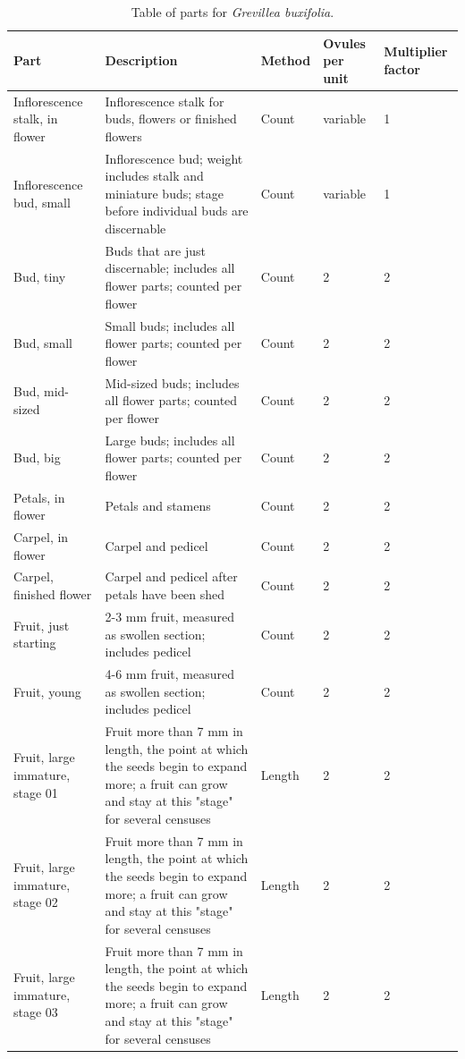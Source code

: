 \documentclass[10pt,twoside]{article}\usepackage[]{graphicx}\usepackage[]{color}
\begin{document}
\begin{longtable}{p{4.5cm}p{6cm}p{2cm}p{1cm}p{1cm}}
\caption{Table of parts for \emph{Grevillea buxifolia}.} \\ 
  \hline
Part & Description & Method & Ovules per unit & Multiplier factor \\ 
  \hline
Inflorescence stalk, in flower & Inflorescence stalk for buds, flowers or finished flowers & Count & variable &   1 \\ 
  Inflorescence bud, small & Inflorescence bud; weight includes stalk and miniature buds; stage before individual buds are discernable & Count & variable &   1 \\ 
  Bud, tiny & Buds that are just discernable; includes all flower parts; counted per flower & Count & 2 &   2 \\ 
  Bud, small & Small buds; includes all flower parts; counted per flower & Count & 2 &   2 \\ 
  Bud, mid-sized & Mid-sized buds; includes all flower parts; counted per flower & Count & 2 &   2 \\ 
  Bud, big & Large buds; includes all flower parts; counted per flower & Count & 2 &   2 \\ 
  Petals, in flower & Petals and stamens & Count & 2 &   2 \\ 
  Carpel, in flower & Carpel and pedicel & Count & 2 &   2 \\ 
  Carpel, finished flower & Carpel and pedicel after petals have been shed & Count & 2 &   2 \\ 
  Fruit, just starting & 2-3 mm fruit, measured as swollen section; includes pedicel & Count & 2 &   2 \\ 
  Fruit, young & 4-6 mm fruit, measured as swollen section; includes pedicel & Count & 2 &   2 \\ 
  Fruit, large immature, stage 01 & Fruit more than 7 mm in length, the point at which the seeds begin to expand more; a fruit can grow and stay at this "stage" for several censuses & Length & 2 &   2 \\ 
  Fruit, large immature, stage 02 & Fruit more than 7 mm in length, the point at which the seeds begin to expand more; a fruit can grow and stay at this "stage" for several censuses & Length & 2 &   2 \\ 
  Fruit, large immature, stage 03 & Fruit more than 7 mm in length, the point at which the seeds begin to expand more; a fruit can grow and stay at this "stage" for several censuses & Length & 2 &   2 \\ 

\end{longtable}
\end{document}
